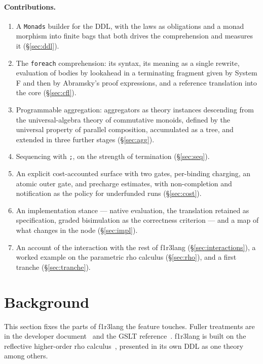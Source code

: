 \documentclass[11pt]{article}
\theoremstyle{branddef}
\theoremstyle{brandplain}
\theoremstyle{brandrem}
\newcommand{\rhoc}{\textsf{rho}}
\newcommand{\fe}{\texttt{foreach}}
\newcommand{\flang}{\textsf{f1r3lang}}
\begin{document}
\paragraph{Contributions.}
\begin{enumerate}[nosep]
\item A \texttt{Monads} builder for the DDL, with the laws as obligations and a
monad morphism into finite bags that both drives the comprehension and measures
it (\S\ref{sec:ddl}).
\item The \fe{} comprehension: its syntax, its meaning as a single rewrite,
evaluation of bodies by lookahead in a terminating fragment given by System F
and then by Abramsky's proof expressions, and a reference translation into the
core (\S\ref{sec:cfl}).
\item Programmable aggregation: aggregators as theory instances descending
from the universal-algebra theory of commutative monoids, defined by the universal property of parallel
composition, accumulated as a tree, and extended in three further stages
(\S\ref{sec:agg}).
\item Sequencing with \texttt{;}, on the strength of termination
(\S\ref{sec:seq}).
\item An explicit cost-accounted surface with two gates, per-binding charging,
an atomic outer gate, and precharge estimates, with non-completion and
notification as the policy for underfunded runs
(\S\ref{sec:cost}).
\item An implementation stance --- native evaluation, the translation retained
as specification, graded bisimulation as the correctness criterion --- and a
map of what changes in the node (\S\ref{sec:impl}).
\item An account of the interaction with the rest of \flang{}
(\S\ref{sec:interactions}), a worked example on the parametric \rhoc{} calculus
(\S\ref{sec:rho}), and a first tranche (\S\ref{sec:tranche}).
\end{enumerate}

\section{Background}
\label{sec:background}

This section fixes the parts of \flang{} the feature touches. Fuller
treatments are in the developer document~\cite{F1R3Dev} and the GSLT
reference~\cite{GSLTintro}. \flang{} is built on the reflective higher-order
\rhoc{} calculus~\cite{MR05}, presented in its own DDL as one theory among
others.
\end{document}
